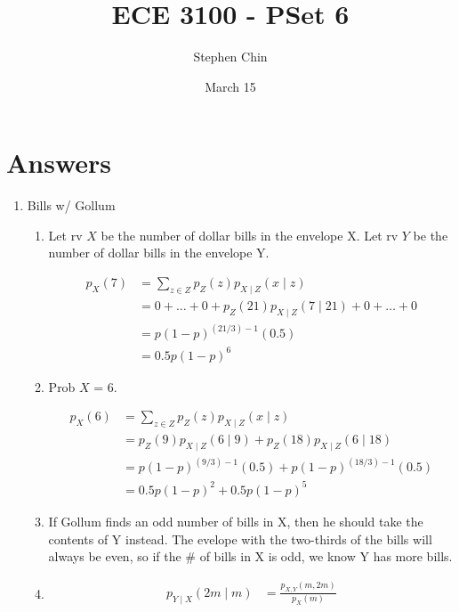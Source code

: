 \documentclass{article}
\title{ECE 3100 - PSet 6}
\author{Stephen Chin}
\date{March 15}
\begin{document}
\maketitle

\section{Answers}

\begin{enumerate}
\item Bills w/ Gollum
  \begin{enumerate}
  \item Let rv $X$ be the number of dollar bills in the envelope X.
    Let rv $Y$ be the number of dollar bills in the envelope Y.

    \[
      \begin{aligned}
        p_X(7)
        &= \sum\limits_{z \in Z} p_Z(z) p_{X \mid Z}(x \mid z) \\
        &= 0 + \dots + 0 + p_Z(21) p_{X \mid Z}(7 \mid 21) + 0 + \dots + 0 \\
        &= p(1-p)^{(21/3) - 1} (0.5) \\
        &= 0.5p(1-p)^6
      \end{aligned}
    \]

  \item Prob $X$ = 6.
    
    \[
      \begin{aligned}
        p_X(6)
        &= \sum\limits_{z \in Z} p_Z(z) p_{X \mid Z}(x \mid z) \\
        &= p_Z(9) p_{X \mid Z}(6 \mid 9) + p_Z(18) p_{X \mid Z}(6 \mid 18) \\
        &= p(1-p)^{(9/3) - 1} (0.5) + p(1-p)^{(18/3) - 1} (0.5) \\
        &= 0.5p(1-p)^2 + 0.5p(1-p)^5
      \end{aligned}
    \]

  \item If Gollum finds an odd number of bills in X, then he should
    take the contents of Y instead. The evelope with the two-thirds of
    the bills will always be even, so if the \# of bills in X is odd,
    we know Y has more bills.

  \item
    \[
      \begin{aligned}
        p_{Y \mid X}(2m \mid m)
        &= \frac{p_{X,Y}(m,2m)}{p_X(m)} \\
        

\end{aligned}\]
\end{enumerate}
\end{enumerate}
\end{document}
